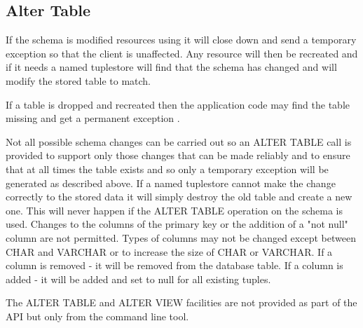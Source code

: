 \subsection {Alter Table}

If the schema is modified resources using it will close down and send a temporary
exception so that the client is unaffected. Any resource will then be recreated
and if it needs a named tuplestore will find that the schema has changed and
will modify the stored table to match. 

If a table is dropped and recreated then the application code may find the table
missing and get a permanent exception .

Not all possible schema changes can be
carried out so an ALTER TABLE call is provided to support only those changes
that can be made reliably and to ensure that at all times the table exists and
so only a temporary exception will be generated as described above.
If a named tuplestore cannot make the change correctly to the stored data it
will simply destroy the old table and create a new one. This will never happen if the
ALTER TABLE operation on the schema is used. Changes to the columns of the
primary key or the addition of a "not null" column are not permitted. Types of
columns may not be changed except between CHAR and VARCHAR or to increase the
size of CHAR or VARCHAR. If a column is removed - it will be removed from the
database table. If a column is added - it will be added and set to null for all
existing tuples.

The ALTER TABLE and ALTER VIEW facilities are not provided as part of the API
but only from the command line tool.


